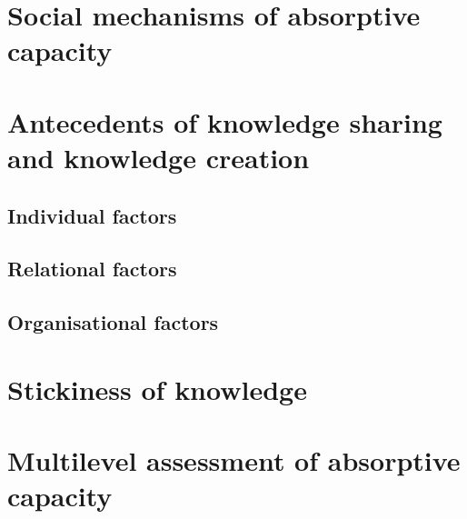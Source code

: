 
\section{Social mechanisms of absorptive capacity}

\section{Antecedents of knowledge sharing and knowledge creation}

\subsection{Individual factors}

\subsection{Relational factors}

\subsection{Organisational factors}

\section{Stickiness of knowledge}

\section{Multilevel assessment of absorptive capacity}
